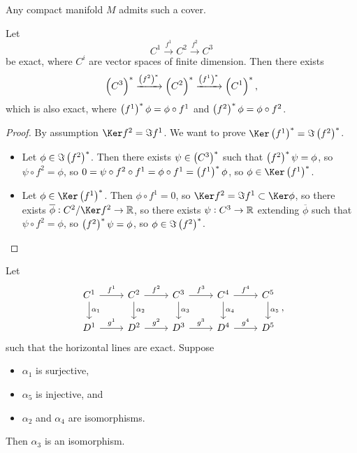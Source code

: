 Any compact manifold $ M $ admits such a cover.

\begin{lemma}
\label{lem:2.53}
Let
$$ C^1 \xrightarrow{f^1} C^2 \xrightarrow{f^2} C^3 $$
be exact, where $ C^i $ are vector spaces of finite dimension. Then there exists
$$ \br{C^3}^* \xrightarrow{\br{f^2}^*} \br{C^2}^* \xrightarrow{\br{f^1}^*} \br{C^1}^*, $$
which is also exact, where $ \br{f^1}^*\phi = \phi \circ f^1 $ and $ \br{f^2}^*\phi = \phi \circ f^2 $.
\end{lemma}

\begin{proof}
By assumption $ \Ker f^2 = \Im f^1 $. We want to prove $ \Ker \br{f^1}^* = \Im \br{f^2}^* $.
\begin{itemize}
\item Let $ \phi \in \Im \br{f^2}^* $. Then there exists $ \psi \in \br{C^3}^* $ such that $ \br{f^2}^*\psi = \phi $, so $ \psi \circ f^2 = \phi $, so $ 0 = \psi \circ f^2 \circ f^1 = \phi \circ f^1 = \br{f^1}^*\phi $, so $ \phi \in \Ker \br{f^1}^* $.
\item Let $ \phi \in \Ker \br{f^1}^* $. Then $ \phi \circ f^1 = 0 $, so $ \Ker f^2 = \Im f^1 \subset \Ker \phi $, so there exists $ \overline{\phi} : C^2 / \Ker f^2 \to \RR $, so there exists $ \psi : C^3 \to \mathbb{R} $ extending $ \overline{\phi} $ such that $ \psi \circ f^2 = \phi $, so $ \br{f^2}^*\psi = \phi $, so $ \phi \in \Im \br{f^2}^* $.
\end{itemize}
\end{proof}

\begin{lemma}
Let
$$
\begin{tikzcd}
C^1 \arrow{r}{f^1} \arrow{d}{\alpha_1} & C^2 \arrow{r}{f^2} \arrow{d}{\alpha_2} & C^3 \arrow{r}{f^3} \arrow{d}{\alpha_3} & C^4 \arrow{r}{f^4} \arrow{d}{\alpha_4} & C^5 \arrow{d}{\alpha_5} \\
D^1 \arrow{r}{g^1} & D^2 \arrow{r}{g^2} & D^3 \arrow{r}{g^3} & D^4 \arrow{r}{g^4} & D^5
\end{tikzcd},
$$
such that the horizontal lines are exact. Suppose
\begin{itemize}
\item $ \alpha_1 $ is surjective,
\item $ \alpha_5 $ is injective, and
\item $ \alpha_2 $ and $ \alpha_4 $ are isomorphisms.
\end{itemize}
Then $ \alpha_3 $ is an isomorphism.
\end{lemma}


